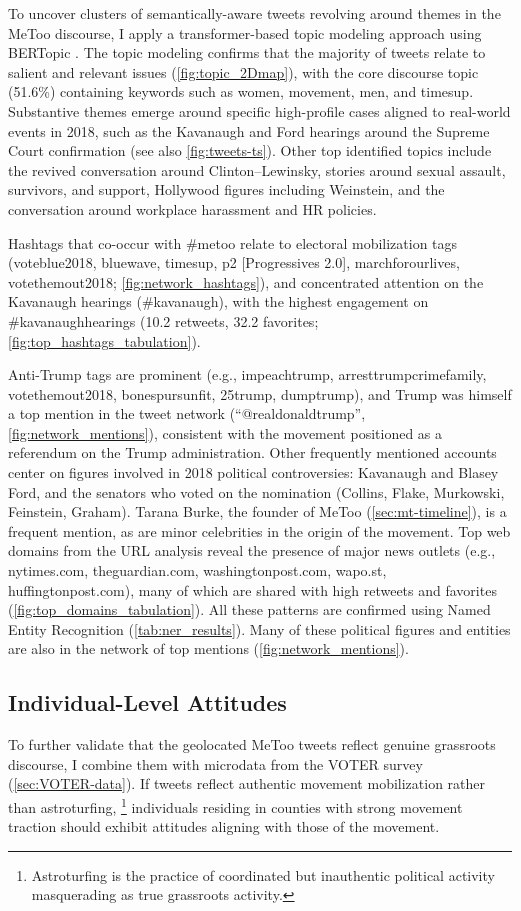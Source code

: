 \documentclass[manuscript,screen,nonacm,11pt,acm]{acmart}
\begin{document}
To uncover clusters of semantically-aware tweets revolving around themes in the MeToo discourse, I apply a transformer-based topic modeling approach using BERTopic  \citep{bertopic}.
The topic modeling confirms that the majority of tweets relate to salient and relevant issues (\cref{fig:topic_2Dmap}), with the core discourse topic (51.6\%) containing keywords such as women, movement, men, and timesup.
Substantive themes emerge around specific high-profile cases aligned to real-world events in 2018, such as the Kavanaugh and Ford hearings around the Supreme Court confirmation (see also \cref{fig:tweets-ts}).
Other top identified topics include the revived conversation around Clinton--Lewinsky, stories around sexual assault, survivors, and support, Hollywood figures including Weinstein, and the conversation around workplace harassment and HR policies.

Hashtags that co-occur with \#metoo relate to electoral mobilization tags (voteblue2018, bluewave, timesup, p2 [Progressives 2.0], marchforourlives, votethemout2018; \cref{fig:network_hashtags}), and concentrated attention on the Kavanaugh hearings (\#kavanaugh), with the highest engagement on \#kavanaughhearings (10.2 retweets, 32.2 favorites; \cref{fig:top_hashtags_tabulation}).

Anti-Trump tags are prominent (e.g., impeachtrump, arresttrumpcrimefamily, votethemout2018, bonespursunfit, 25trump, dumptrump), and Trump was himself a top mention in the tweet network (``@realdonaldtrump'', \cref{fig:network_mentions}), consistent with the movement positioned as a referendum on the Trump administration.
Other frequently mentioned accounts center on figures involved in 2018 political controversies: Kavanaugh and Blasey Ford, and the senators who voted on the nomination (Collins, Flake, Murkowski, Feinstein, Graham).
Tarana Burke, the founder of MeToo (\cref{sec:mt-timeline}), is a frequent mention, as are minor celebrities in the origin of the movement.
Top web domains from the URL analysis reveal the presence of major news outlets (e.g., nytimes.com, theguardian.com, washingtonpost.com, wapo.st, huffingtonpost.com), many of which are shared with high retweets and favorites (\cref{fig:top_domains_tabulation}).
All these patterns are confirmed using Named Entity Recognition (\cref{tab:ner_results}).
Many of these political figures and entities are also in the network of top mentions (\cref{fig:network_mentions}).

\subsection{Individual-Level Attitudes}
\label{sec:VOTER-validation}
To further validate that the geolocated MeToo tweets reflect genuine grassroots discourse, I combine them with microdata from the VOTER survey (\cref{sec:VOTER-data}).
If tweets reflect authentic movement mobilization rather than astroturfing,%
\footnote{Astroturfing is the practice of coordinated but inauthentic political activity masquerading as true grassroots activity.}
individuals residing in counties with strong movement traction should exhibit attitudes aligning with those of the movement.
\end{document}
